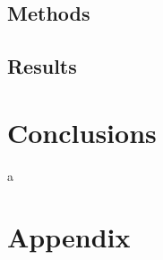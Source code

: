 \documentclass[11pt,a4paper,twocolumn]{IEEEtran}
\begin{document}
		\subsection{\textbf{Methods}}
		\subsection{\textbf{Results}}
			
	\section{\textbf{Conclusions}}
	
	\newpage
	a
	\newpage
	\onecolumn
	\section{\textbf{Appendix}}
		
	
\end{document}
